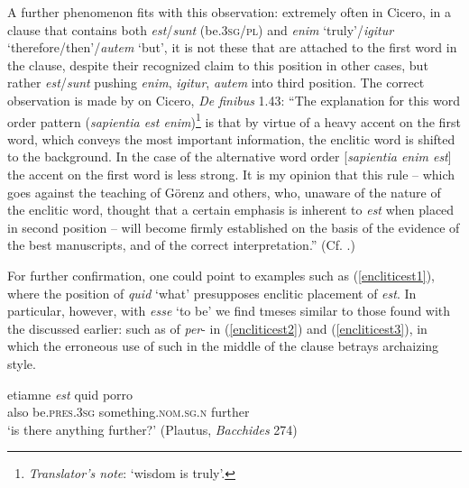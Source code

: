A further phenomenon fits with this observation: extremely often in Cicero, in a clause that contains both \emph{est}/\emph{sunt} (be.\textsc{3sg/pl}) and \emph{enim} `truly'/\emph{igitur} `therefore/then'/\emph{autem} `but', it is not these  that are attached to the first word in the clause, despite their recognized claim to this position in other cases, but rather \emph{est}/\emph{sunt} pushing \emph{enim}, \emph{igitur}, \emph{autem} into third position. The correct observation is made by \citet{Madvig1839} on Cicero, \textit{De finibus} 1.43: ``The explanation for this word order pattern (\textit{sapientia est enim})\footnote{\emph{Translator's note}: `wisdom is truly'.} is that by virtue of a heavy accent on the first word, which conveys the most important information, the enclitic word is shifted to the background. In the case of the alternative word order {[}\textit{sapientia enim est}{]} the accent on the first word is less strong. It is my opinion that this rule -- which goes against the teaching of Görenz and others, who, unaware of the nature of the enclitic word, thought that a certain emphasis is inherent to \textit{est} when placed in second position -- will become firmly established on the basis of the evidence of the best manuscripts, and of the correct interpretation.'' (Cf. \citealp[411]{SeyffertMueller1876}.)

For further confirmation, one could point to examples such as (\ref{encliticest1}), where the position of \emph{quid} `what' presupposes enclitic placement of \emph{est}. In particular, however, with \emph{esse} `to be' we find tmeses similar to those found with the  discussed earlier: such as of \emph{per}- in (\ref{encliticest2}) and (\ref{encliticest3}), in which the erroneous use of such  in the middle of the clause betrays archaizing style.

\begin{exe}
\ex
\gll etiamne \emph{est} quid porro\\
also be.\textsc{pres.3sg} something.\textsc{nom.sg.n} further\\ 
\trans `is there anything further?' (Plautus, \textit{Bacchides} 274)
\label{encliticest1}
\end{exe}

